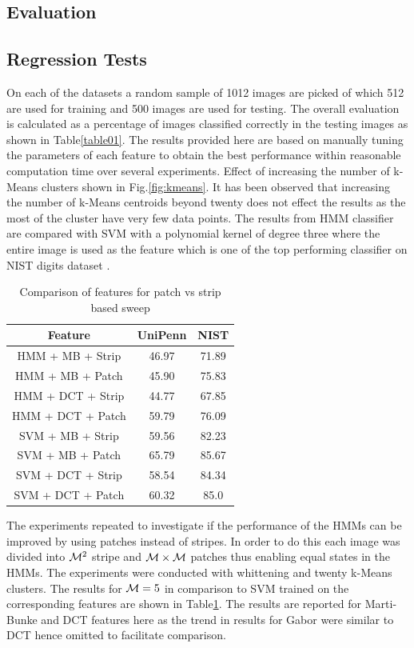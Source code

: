 \documentclass[runningheads]{llncs}
\def\M{{\cal M}}
\begin{document}
\subsection{Evaluation}
\label{ssec:eval}
\subsection{Regression Tests}
On each of the datasets a random sample of 1012 images are picked of which 512 are used for training and 500 images are used for testing. The overall evaluation is calculated as a percentage of images classified correctly in the testing images as shown in Table\ref{table01}. The results provided here are based on manually tuning the parameters of each feature to obtain the best performance within reasonable computation time over several experiments. Effect of increasing the number of k-Means clusters shown in Fig.\ref{fig:kmeans}. It has been observed that increasing the number of k-Means centroids beyond twenty does not effect the results as the most of the cluster have very few data points. The results from HMM classifier are compared with SVM with a polynomial kernel of degree three where the entire image is used as the feature which is one of the top performing classifier on NIST digits dataset \cite{LeCun98}.


\begin{table}[!t]
\caption{Comparison of features for patch vs strip based sweep}
\label{table02}
\centering
\begin{tabular}[t]{|c|c|c|}
\hline
Feature & UniPenn & NIST \\ \hline
HMM + MB + Strip & 46.97 & 71.89 \\ \hline
HMM + MB + Patch & 45.90 & 75.83 \\ \hline
HMM + DCT + Strip & 44.77 & 67.85 \\ \hline
HMM + DCT + Patch & 59.79 & 76.09 \\ \hline \hline
SVM + MB + Strip & 59.56 & 82.23 \\ \hline
SVM + MB + Patch & 65.79 & 85.67 \\ \hline
SVM + DCT + Strip & 58.54 & 84.34 \\ \hline
SVM + DCT + Patch & 60.32 & 85.0 \\ \hline
\end{tabular}
\end{table}

The experiments repeated  to investigate if the performance of the HMMs can be improved by using patches instead of stripes. In order to do this each image was divided into $\M^2$ stripe and $\M \times \M$ patches thus enabling equal states in the HMMs. The experiments were conducted with whittening and twenty k-Means clusters. The results for $\M=5$ in comparison to SVM trained on the corresponding features are shown in Table\ref{table02}. The results are reported for Marti-Bunke and DCT features here as the trend in results for Gabor were similar to DCT hence omitted to facilitate comparison.
\end{document}

